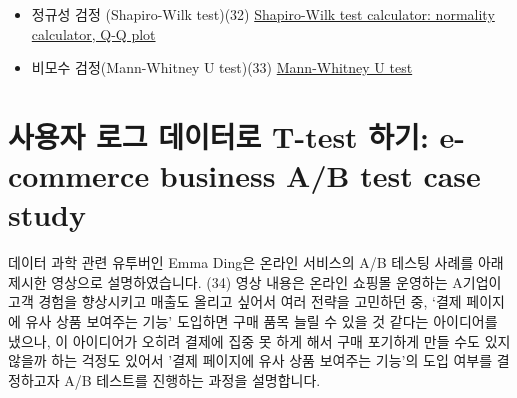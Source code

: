 \documentclass[
  letterpaper,
]{book}
\begin{document}
\begin{itemize}
\item
  정규성 검정 (Shapiro-Wilk test)(32)
  \href{https://www.statskingdom.com/shapiro-wilk-test-calculator.html}{Shapiro-Wilk
  test calculator: normality calculator, Q-Q plot}
\item
  비모수 검정(Mann-Whitney U test)(33)
  \href{https://www.statskingdom.com/170median_mann_whitney.html}{Mann-Whitney
  U test}
\end{itemize}

\section{사용자 로그 데이터로 T-test 하기: e-commerce business A/B test
case
study}\label{uxc0acuxc6a9uxc790-uxb85cuxadf8-uxb370uxc774uxd130uxb85c-t-test-uxd558uxae30-e-commerce-business-ab-test-case-study}

데이터 과학 관련 유투버인 Emma Ding은 온라인 서비스의 A/B 테스팅 사례를
아래 제시한 영상으로 설명하였습니다. (34) 영상 내용은 온라인 쇼핑몰
운영하는 A기업이 고객 경험을 향상시키고 매출도 올리고 싶어서 여러 전략을
고민하던 중, `결제 페이지에 유사 상품 보여주는 기능' 도입하면 구매 품목
늘릴 수 있을 것 같다는 아이디어를 냈으나, 이 아이디어가 오히려 결제에
집중 못 하게 해서 구매 포기하게 만들 수도 있지 않을까 하는 걱정도 있어서
'결제 페이지에 유사 상품 보여주는 기능'의 도입 여부를 결정하고자 A/B
테스트를 진행하는 과정을 설명합니다.
\end{document}
